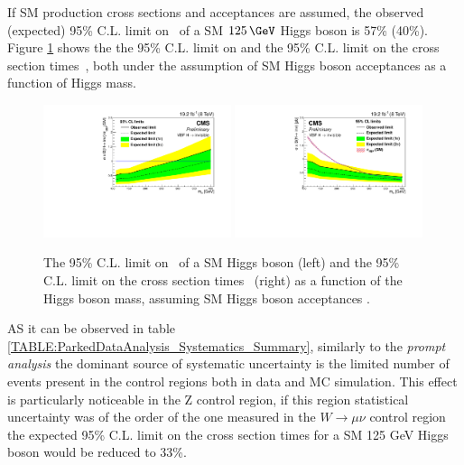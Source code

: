 If \gls{SM} production cross sections and acceptances are assumed, the observed (expected) 95\% C.L. limit on \BRinv\, of a \gls{SM} $125\,\GeV$ Higgs boson is 57\% (40\%). Figure \ref{FIGURE:ParkedDataAnalysis_Limits_VBFLimit} shows the the 95\% C.L. limit on \BRinv and the 95\% C.L. limit on the cross section times \BRinv\,, both under the assumption of \gls{SM} Higgs boson acceptances as a function of Higgs mass.

\begin{figure}[!htb]
\centering
\includegraphics[width=0.49\textwidth]{Chapter07/Images/vbflimit.pdf}
\includegraphics[width=0.49\textwidth]{Chapter07/Images/vbfxslimit.pdf}
\caption{The 95\% C.L. limit on \BRinv\, of a SM Higgs boson (left) and the 95\% C.L. limit on the cross section times \BRinv\ (right) as a function of the Higgs boson mass, assuming SM Higgs boson acceptances \cite{ARTICLE:CMSVBFHiggsInvisibleParkedAnalysisPAS}.}
\label{FIGURE:ParkedDataAnalysis_Limits_VBFLimit}
\end{figure}

AS it can be observed in table \ref{TABLE:ParkedDataAnalysis_Systematics_Summary}, similarly to the \textit{prompt analysis} the dominant source of systematic uncertainty is the limited number of events present in the control regions both in data and \gls{MC} simulation. This effect is particularly noticeable in the Z control region, if this region statistical uncertainty was of the order of the one measured in the $W\rightarrow\mu\nu$ control region the expected 95\% C.L. limit on the cross section times \BRinv for a \gls{SM} 125 GeV Higgs boson would be reduced to 33\%.

